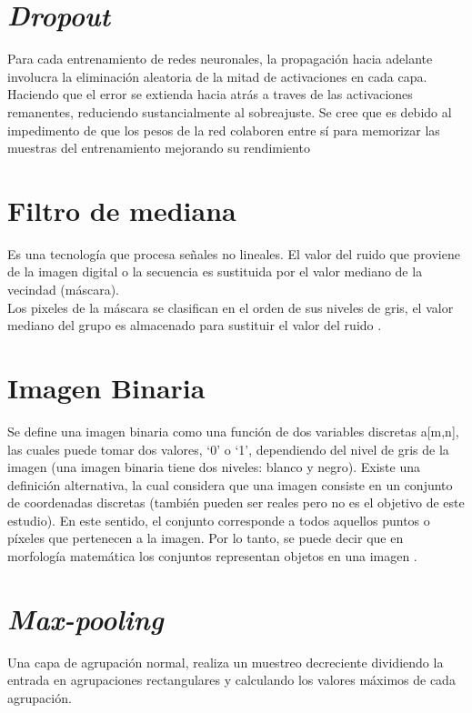 \section{\textit{Dropout}}

Para cada entrenamiento de redes neuronales, la propagación hacia adelante involucra la eliminación aleatoria de la mitad de activaciones en cada capa. Haciendo que el error se extienda hacia atrás a traves de las activaciones remanentes, reduciendo sustancialmente al sobreajuste. Se cree que es debido al impedimento de que los pesos de la red colaboren entre sí para memorizar las muestras del entrenamiento mejorando su rendimiento \cite{hinton2012improving}

\section{Filtro de mediana}

Es una tecnología que procesa señales no lineales. El valor del ruido que proviene de la imagen digital o la secuencia es sustituida por el valor mediano de la vecindad (máscara).\\
Los pixeles de la máscara se clasifican en el orden de sus niveles de gris, el valor mediano del grupo es almacenado para sustituir el valor del ruido \cite{zhu2012improved}.

\section{Imagen Binaria} Se define una imagen binaria como una función de dos variables discretas
a[m,n], las cuales puede tomar dos valores, ‘0’ o ‘1’, dependiendo del nivel de gris de la
imagen (una imagen binaria tiene dos niveles: blanco y negro). Existe una definición alternativa, la cual considera que una imagen consiste en un conjunto de
coordenadas discretas (también pueden ser reales pero no es el objetivo de este estudio). En este sentido, el conjunto corresponde a todos aquellos puntos o píxeles que pertenecen a la imagen. Por lo tanto, se puede decir que en morfología matemática los conjuntos representan objetos en una imagen \cite{ref_12}.

\section{\textit{Max-pooling}}

Una capa de agrupación normal, realiza un muestreo decreciente dividiendo la entrada en agrupaciones rectangulares y calculando los valores máximos de cada agrupación.\\

